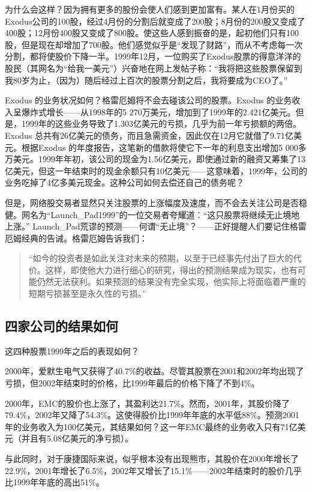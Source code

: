 \documentclass[12pt,oneside]{book}
\begin{document}
为什么会这样？因为拥有更多的股份会使人们感到更加富有。某人在1月份买的Exodus公司的100股，经过4月份的分割后就变成了200股；8月份的200股又变成了400股；12月份400股又变成了800股。使这些人感到振奋的是，起初他们只有100股，但是现在却增加了700股。他们感觉似乎是“发现了财路”，而从不考虑每一次分割，都将使股价下降一半。1999年12月，一位购买了Exodus股票的得意洋洋的股民（其网名为“给我一美元”）兴奋地在网上发帖子称：“我将把这些股票保留到我80岁为止，（因为）随后经过上百次的股票分割之后，我将要成为CEO了。”

Exodus 的业务状况如何？格雷厄姆将不会去碰该公司的股票。Exodus 的业务收入呈爆炸式增长——从1998年的5 270万美元，增加到了1999年的2.421亿美元。但是，1999年的这些业务导致了1.303亿美元的亏损，几乎为前一年亏损额的两倍。Exodus 总共有26亿美元的债务，而且急需资金，因此仅在12月它就借了9.71亿美元。根据Exodus 的年度报告，这笔新的借款将使它下一年的利息支出增加5 000多万美元。1999年年初，该公司的现金为1.56亿美元，即使通过新的融资又筹集了13亿美元，但这一年结束时的现金余额只有10亿美元——这意味着，1999年，公司的业务吃掉了4亿多美元现金。这种公司如何去偿还自己的债务呢？

但是，网络股交易者显然只关注股票的上涨幅度及速度，而不会去关注公司是否稳健。网名为“Launch\_{}Pad1999”的一位交易者夸耀道：“这只股票将继续无止境地上涨。”
Launch\_{}Pad荒谬的预测——何谓“无止境”？——正好提醒人们要记住格雷厄姆经典的告诫。格雷厄姆告诉我们：

\begin{quote}
“如今的投资者是如此关注对未来的预期，以至于已经事先付出了巨大的代价。这样，即使他大力进行细心的研究，得出的预测结果成为现实，也有可能仍然无法获利。如果预测的结果没有完全实现，他实际上将面临着严重的短期亏损甚至是永久性的亏损。”
\end{quote}


\subsection{四家公司的结果如何}
这四种股票1999年之后的表现如何？

2000年，爱默生电气又获得了40.7\%的收益。尽管其股票在2001和2002年均出现了亏损，但2002年结束时的价格，比1999年最后的价格下降了不到4\%。

2000年，EMC的股价也上涨了，其盈利达21.7\%。然而，2001年，其股价降了79.4\%，2002年又降了54.3\%。这使得股价比1999年年底的水平低88\%。预测2001年的业务收入为100亿美元，其结果如何？这一年EMC最终的业务收入只有71亿美元（并且有5.08亿美元的净亏损）。

与此同时，对于康捷国际来说，似乎根本没有出现熊市，其股价在2000年增长了22.9\%，2001年增长了6.5\%，2002年又增长了15.1\%——2002年结束时的股价几乎比1999年年底的高出51\%。
\end{document}
